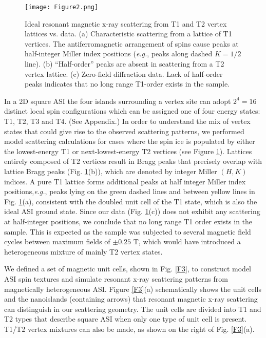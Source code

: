 \documentclass[aps, prb, reprint, showpacs, superscriptaddress]{revtex4-1}
\begin{document}
\begin{figure}
\texttt{[image: Figure2.png]}
\caption{ 
Ideal resonant magnetic x-ray scattering from T1 and T2 vertex lattices vs. data. 
(a) Characteristic scattering from a lattice of T1 vertices. 
The antiferromagnetic arrangement of spins cause peaks at half-integer Miller index positions (\textit{e.g.}, peaks along dashed $K = 1/2$ line). 
(b) ``Half-order'' peaks are absent in scattering from a T2 vertex lattice.  
(c) Zero-field diffraction data. 
Lack of half-order peaks indicates that no long range T1-order exists in the sample. 
}
\label{F2} 
\end{figure}

In a 2D square ASI the four islands surrounding a vertex site can adopt $2^4=16$ distinct local spin configurations which can be assigned one of four energy states: T1, T2, T3 and T4. 
(See Appendix.)
In order to understand the mix of vertex states that could give rise to the observed scattering patterns, we performed model scattering calculations for cases where the spin ice is populated by either the lowest-energy T1 or next-lowest-energy T2 vertices (see Figure \ref{F2}).
Lattices entirely composed of T2 vertices result in Bragg peaks that precisely overlap with lattice Bragg peaks (Fig. \ref{F2}(b)), which are denoted by integer Miller $(H, K)$ indices.
A pure T1 lattice forms additional peaks at half integer Miller index positions,\textit{e.g.}, peaks lying on the green dashed lines and between yellow lines in Fig. \ref{F2}(a), consistent with the doubled unit cell of the T1 state, which is also the ideal ASI ground state.
Since our data (Fig. \ref{F2}(c)) does not exhibit any scattering at half-integer positions, we conclude that no long range T1 order exists in the sample.  
This is expected as the sample was subjected to several magnetic field cycles between maximum fields of $\pm 0.25$ T, which would have introduced a heterogeneous mixture of mainly T2 vertex states.\cite{Farhan}

We defined a set of magnetic unit cells, shown in Fig. \ref{F3}, to construct model ASI spin textures and simulate resonant x-ray scattering patterns from magnetically heterogeneous ASI.
Figure \ref{F3}(a) schematically shows the unit cells and the nanoislands (containing arrows) that resonant magnetic x-ray scattering can distinguish in our scattering geometry.
The unit cells are divided into T1 and T2 types that describe square ASI when only one type of unit cell is present.   
T1/T2 vertex mixtures can also be made, as shown on the right of Fig. \ref{F3}(a).
\end{document}
